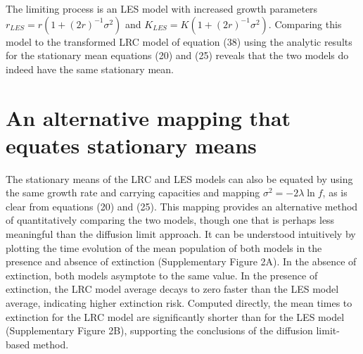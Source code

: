 The limiting process is an LES model with increased growth parameters $r_{LES} = r(1+(2r)^{-1}\sigma^2)$ and $K_{LES} = K(1+(2r)^{-1}\sigma^2)$.  Comparing this model to the transformed LRC model of equation (38) using the analytic results for the stationary mean equations (20) and (25) reveals that the two models do indeed have the same stationary mean.


\section*{An alternative mapping that equates stationary means}

The stationary means of the LRC and LES models can also be equated by using the same growth rate and carrying capacities and mapping $\sigma^2 = -2\lambda\ln f$, as is clear from equations (20) and (25).  This mapping provides an alternative method of quantitatively comparing the two models, though one that is perhaps less meaningful than the diffusion limit approach.  It can be understood intuitively by plotting the time evolution of the mean population of both models in the presence and absence of extinction (Supplementary Figure 2A).  In the absence of extinction, both models asymptote to the same value.  In the presence of extinction, the LRC model average decays to zero faster than the LES model average, indicating higher extinction risk.  Computed directly, the mean times to extinction for the LRC model are significantly shorter than for the LES model (Supplementary Figure 2B), supporting the conclusions of the diffusion limit-based method.


